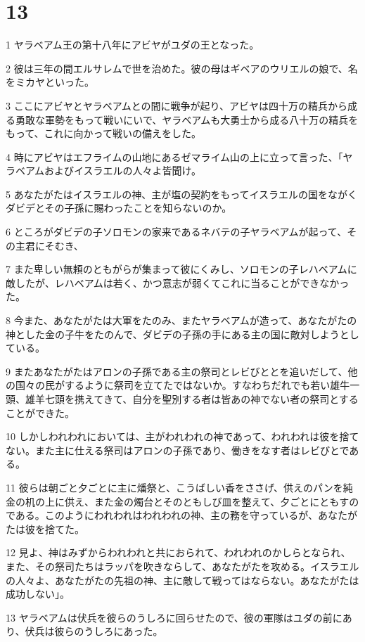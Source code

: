 \chapter{13}

\par 1 ヤラベアム王の第十八年にアビヤがユダの王となった。
\par 2 彼は三年の間エルサレムで世を治めた。彼の母はギベアのウリエルの娘で、名をミカヤといった。
\par 3 ここにアビヤとヤラベアムとの間に戦争が起り、アビヤは四十万の精兵から成る勇敢な軍勢をもって戦いにいで、ヤラベアムも大勇士から成る八十万の精兵をもって、これに向かって戦いの備えをした。
\par 4 時にアビヤはエフライムの山地にあるゼマライム山の上に立って言った、「ヤラベアムおよびイスラエルの人々よ皆聞け。
\par 5 あなたがたはイスラエルの神、主が塩の契約をもってイスラエルの国をながくダビデとその子孫に賜わったことを知らないのか。
\par 6 ところがダビデの子ソロモンの家来であるネバテの子ヤラベアムが起って、その主君にそむき、
\par 7 また卑しい無頼のともがらが集まって彼にくみし、ソロモンの子レハベアムに敵したが、レハベアムは若く、かつ意志が弱くてこれに当ることができなかった。
\par 8 今また、あなたがたは大軍をたのみ、またヤラベアムが造って、あなたがたの神とした金の子牛をたのんで、ダビデの子孫の手にある主の国に敵対しようとしている。
\par 9 またあなたがたはアロンの子孫である主の祭司とレビびととを追いだして、他の国々の民がするように祭司を立てたではないか。すなわちだれでも若い雄牛一頭、雄羊七頭を携えてきて、自分を聖別する者は皆あの神でない者の祭司とすることができた。
\par 10 しかしわれわれにおいては、主がわれわれの神であって、われわれは彼を捨てない。また主に仕える祭司はアロンの子孫であり、働きをなす者はレビびとである。
\par 11 彼らは朝ごと夕ごとに主に燔祭と、こうばしい香をささげ、供えのパンを純金の机の上に供え、また金の燭台とそのともしび皿を整えて、夕ごとにともすのである。このようにわれわれはわれわれの神、主の務を守っているが、あなたがたは彼を捨てた。
\par 12 見よ、神はみずからわれわれと共におられて、われわれのかしらとなられ、また、その祭司たちはラッパを吹きならして、あなたがたを攻める。イスラエルの人々よ、あなたがたの先祖の神、主に敵して戦ってはならない。あなたがたは成功しない」。
\par 13 ヤラベアムは伏兵を彼らのうしろに回らせたので、彼の軍隊はユダの前にあり、伏兵は彼らのうしろにあった。
